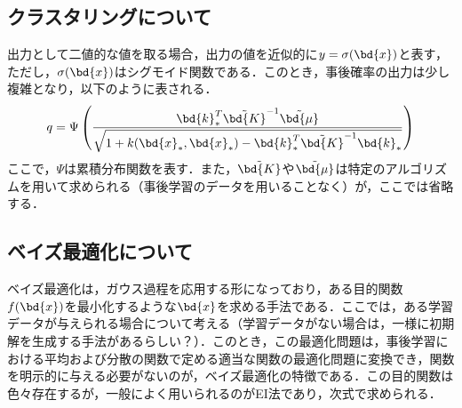 	\subsection{クラスタリングについて}
		出力として二値的な値を取る場合，出力の値を近似的に$ y = \sigma(\bd{x}) $と表す，ただし，$ \sigma(\bd{x}) $はシグモイド関数である．このとき，事後確率の出力は少し複雑となり，以下のように表される．
		\begin{equation}\label{eq:y_*=1}
			q = \Psi\left( \frac{\bd{k}_*^T \tilde{\bd{K}}^{-1} \tilde{\bd{\mu}}}{\sqrt{1+k(\bd{x}_*,\bd{x}_*)-\bd{k}_*^T \tilde{\bd{K}}^{-1} \bd{k}_*}} \right)
		\end{equation}
		ここで，$ \Psi $は累積分布関数を表す．また，$ \tilde{\bd{K}} $や$ \tilde{\bd{\mu}} $は特定のアルゴリズムを用いて求められる（事後学習のデータを用いることなく）が，ここでは省略する．
	\subsection{ベイズ最適化について}
	ベイズ最適化は，ガウス過程を応用する形になっており，ある目的関数$ f(\bd{x}) $を最小化するような$ \bd{x} $を求める手法である．ここでは，ある学習データが与えられる場合について考える（学習データがない場合は，一様に初期解を生成する手法があるらしい？）．このとき，この最適化問題は，事後学習における平均および分散の関数で定める適当な関数の最適化問題に変換でき，関数を明示的に与える必要がないのが，ベイズ最適化の特徴である．この目的関数は色々存在するが，一般によく用いられるのがEI法であり，次式で求められる．
	